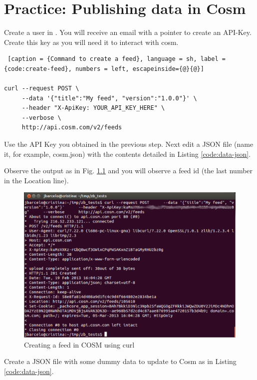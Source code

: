 \chapter{Practice: Publishing data in Cosm}

Create a user in \emph{} .
You will receive an email with a pointer to create an API-Key.
Create this key as you will need it to interact with cosm.

\begin{lstlisting} [caption = {Command to create a feed}, language = sh, label = {code:create-feed}, numbers = left, escapeinside={@}{@}]

curl --request POST \
     --data '{"title":"My feed", "version":"1.0.0"}' \
     --header "X-ApiKey: YOUR_API_KEY_HERE" \
     --verbose \
     http://api.cosm.com/v2/feeds

\end{lstlisting}

Use the API Key you obtained in the previous step.
Next edit a JSON file (name it, for example, cosm.json) with the contents detailed in Listing \ref{code:data-json}.

Observe the output as in Fig. \ref{fig:create-feed} and you will observe a feed id (the last number in the Location line).

\begin{figure}[htbp]
  \centering
  \includegraphics[width=0.9\linewidth]{figures/create-feed.eps}
  \caption{Creating a feed in COSM using curl}
  \label{fig:create-feed}
\end{figure}

Create a JSON file with some dummy data to update to Cosm as in Listing \ref{code:data-json}.

